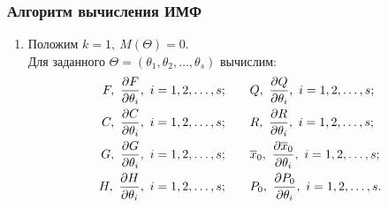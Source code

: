 \documentclass[a4paper,14pt]{extarticle}
\newcommand{\pd}[2]{\frac{\partial #1}{\partial #2}}
\begin{document}
\subsubsection{Алгоритм вычисления ИМФ}
\begin{enumerate}
	\item Положим $k = 1,\ M(\Theta) = 0$. \\
		Для заданного $\Theta = (\theta_1, \theta_2, \ldots, \theta_s)$ вычислим:
\begin{align*}
	F,\ \pd{F}{\theta_i},\ i=1,2,\ldots,s; \qquad &
	Q,\ \pd{Q}{\theta_i},\ i=1,2,\ldots,s; \\
	C,\ \pd{C}{\theta_i},\ i=1,2,\ldots,s; \qquad &
	R,\ \pd{R}{\theta_i},\ i=1,2,\ldots,s; \\
	G,\ \pd{G}{\theta_i},\ i=1,2,\ldots,s; \qquad &
	\ol{x}_0,\ \pd{\ol{x}_0}{\theta_i},\ i=1,2,\ldots,s; \\
	H,\ \pd{H}{\theta_i},\ i=1,2,\ldots,s; \qquad &
	P_0,\ \pd{P_0}{\theta_i},\ i=1,2,\ldots,s.
\end{align*}

\newpage


\end{enumerate}
\end{document}
